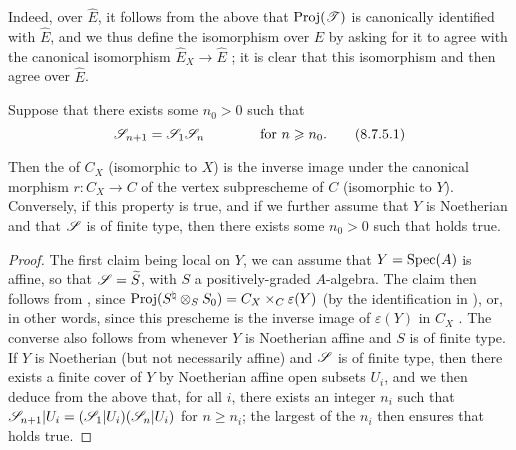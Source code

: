 \begin{remark}[8.7.4]
\begin{enumerate}
    Indeed, over $\widehat{E}$, it follows from the above that $\operatorname{Proj}(\mathscr{T})$ is canonically identified with $\widehat{E}$, and we thus define the isomorphism  over $\widehat{E}$ by asking for it to agree with the canonical isomorphism $\widehat{E}_X\to\widehat{E}$ ;
    it is clear that this isomorphism and  then agree over $\widehat{E}$.
\end{enumerate}
\end{remark}

\begin{corollary}[8.7.5]
\label{II.8.7.5}
Suppose that there exists some $n_0>0$ such that
\[
\label{II.8.7.5.1}
  \mathscr{S}_{n+1} = \mathscr{S}_1\mathscr{S}_n
  \qquad\qquad
  \mbox{for $n\geqslant n_0$.}
\tag{8.7.5.1}
\]

Then the  of $C_X$ (isomorphic to $X$) is the inverse image under the canonical morphism $r:C_X\to C$ of the vertex subprescheme of $C$ (isomorphic to $Y$).
Conversely, if this property is true, and if we further assume that $Y$ is Noetherian and that $\mathscr{S}$ is of finite type, then there exists some $n_0>0$ such that  holds true.
\end{corollary}

\begin{proof}
The first claim being local on $Y$, we can assume that $Y=\operatorname{Spec}(A)$ is affine, so that $\mathscr{S}=\widetilde{S}$, with $S$ a positively-graded $A$-algebra.
The claim then follows from , since $\operatorname{Proj}(S^\natural\otimes_S S_0) = C_X\times_C\varepsilon(Y)$ (by the identification in ), or, in other words, since this prescheme is the inverse image of $\varepsilon(Y)$ in $C_X$ .
The converse also follows from  whenever $Y$ is Noetherian affine and $S$ is of finite type.
If $Y$ is Noetherian (but not necessarily affine) and $\mathscr{S}$ is of finite type, then there exists a finite cover of $Y$ by Noetherian affine open subsets $U_i$, and we then deduce from the above that, for all $i$, there exists an integer $n_i$ such that $\mathscr{S}_{n+1}|U_i = (\mathscr{S}_1|U_i)(\mathscr{S}_n|U_i)$ for $n\geq n_i$;
the largest of the $n_i$ then ensures that  holds true.
\end{proof}

